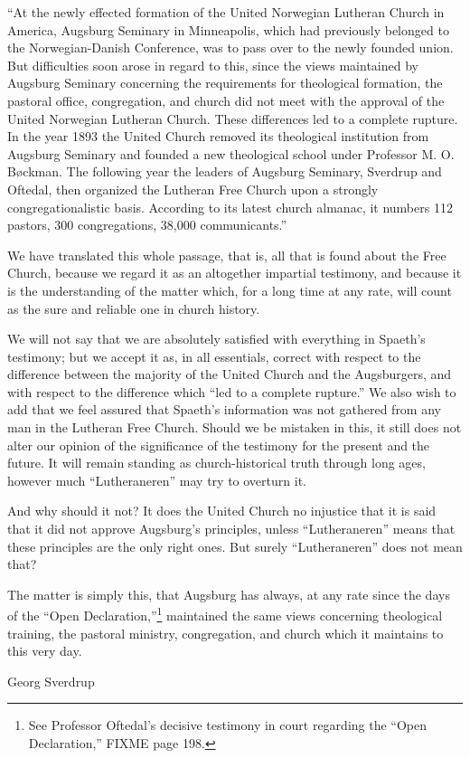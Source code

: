 “At the newly effected formation of the United Norwegian Lutheran Church in America, Augsburg Seminary in Minneapolis, which had previously belonged to the Norwegian-Danish Conference, was to pass over to the newly founded union. But difficulties soon arose in regard to this, since the views maintained by Augsburg Seminary concerning the requirements for theological formation, the pastoral office, congregation, and church did not meet with the approval of the United Norwegian Lutheran Church. These differences led to a complete rupture. In the year 1893 the United Church removed its theological institution from Augsburg Seminary and founded a new theological school under Professor M. O. Bøckman. The following year the leaders of Augsburg Seminary, Sverdrup and Oftedal, then organized the Lutheran Free Church upon a strongly congregationalistic basis. According to its latest church almanac, it numbers 112 pastors, 300 congregations, 38,000 communicants.”

We have translated this whole passage, that is, all that is found about the Free Church, because we regard it as an altogether impartial testimony, and because it is the understanding of the matter which, for a long time at any rate, will count as the sure and reliable one in church history.

We will not say that we are absolutely satisfied with everything in Spaeth’s testimony; but we accept it as, in all essentials, correct with respect to the difference between the majority of the United Church and the Augsburgers, and with respect to the difference which “led to a complete rupture.” We also wish to add that we feel assured that Spaeth’s information was not gathered from any man in the Lutheran Free Church. Should we be mistaken in this, it still does not alter our opinion of the significance of the testimony for the present and the future. It will remain standing as church-historical truth through long ages, however much “Lutheraneren” may try to overturn it.

And why should it not? It does the United Church no injustice that it is said that it did not approve Augsburg’s principles, unless “Lutheraneren” means that these principles are the only right ones. But surely “Lutheraneren” does not mean that?

The matter is simply this, that Augsburg has always, at any rate since the days of the “Open Declaration,”\footnote{See Professor Oftedal’s decisive testimony in court regarding the “Open Declaration,” FIXME page 198.} maintained the same views concerning theological training, the pastoral ministry, congregation, and church which it maintains to this very day. 

Georg Sverdrup

